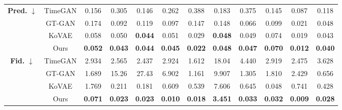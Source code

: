 \documentclass{article}
\theoremstyle{plain}
\theoremstyle{definition}
\theoremstyle{remark}
\begin{document}
\begin{table}[!t]
{\begin{tabular}{cc|cccccccccc}
    \multirow{4}{*}{\textbf{Pred.} $\downarrow$} 
      & TimeGAN 
         & 0.156 
         & 0.305 
         & 0.146 
         & 0.262 
         & 0.388 
         & 0.183 
         & 0.375 
         & 0.145 
         & 0.087 
         & 0.118 \\
      & GT-GAN  
         & 0.174 
         & 0.092 
         & 0.119 
         & 0.097 
         & 0.147 
         & 0.148 
         & 0.066 
         & 0.099 
         & 0.021 
         & 0.048 \\
      & KoVAE   
         & 0.058 
         & 0.050 
         & \cellcolor{blue!10}\textbf{0.044} 
         & 0.051 
         & 0.029 
         & \cellcolor{blue!10}\textbf{0.048} 
         & 0.049 
         & 0.074 
         & 0.019 
         & 0.043 \\
      & Ours    
         & \cellcolor{blue!10}\textbf{0.052} 
         & \cellcolor{blue!10}\textbf{0.043} 
         & \cellcolor{blue!10}\textbf{0.044} 
         & \cellcolor{blue!10}\textbf{0.045}
         & \cellcolor{blue!10}\textbf{0.022} 
         & \cellcolor{blue!10}\textbf{0.048} 
         & \cellcolor{blue!10}\textbf{0.047} 
         & \cellcolor{blue!10}\textbf{0.070} 
         & \cellcolor{blue!10}\textbf{0.012} 
         & \cellcolor{blue!10}\textbf{0.040} \\
    \midrule

    \multirow{4}{*}{\textbf{Fid.} $\downarrow$} 
      & TimeGAN 
         & 2.934 
         & 2.565 
         & 2.437 
         & 2.924 
         & 1.612 
         & 18.04 
         & 4.440 
         & 2.919 
         & 2.475 
         & 3.628 \\
      & GT-GAN  
         & 1.689 
         & 15.26 
         & 27.43 
         & 6.902 
         & 1.161 
         & 9.907 
         & 1.305 
         & 1.810 
         & 2.429 
         & 0.656 \\
      & KoVAE   
         & 1.769 
         & 0.211 
         & 0.181 
         & 0.609 
         & 0.539 
         & 7.606 
         & 0.645 
         & 0.048 
         & 0.741 
         & 0.428 \\
      & Ours    
         & \cellcolor{blue!10}\textbf{0.071} 
         & \cellcolor{blue!10}\textbf{0.023}
         & \cellcolor{blue!10}\textbf{0.023}
         & \cellcolor{blue!10}\textbf{0.010}
         & \cellcolor{blue!10}\textbf{0.018}
         & \cellcolor{blue!10}\textbf{3.451} 
         & \cellcolor{blue!10}\textbf{0.033}
         & \cellcolor{blue!10}\textbf{0.032}
         & \cellcolor{blue!10}\textbf{0.009}
         & \cellcolor{blue!10}\textbf{0.028} \\
    \midrule


\end{tabular}}
\end{table}
\end{document}

